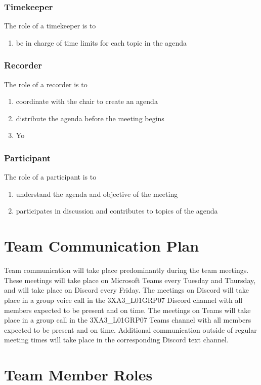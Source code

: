 \documentclass[12pt,letterpaper]{article}
\begin{document}
\subsubsection{Timekeeper}
The role of a timekeeper is to
\begin{enumerate}
    \item be in charge of time limits for each topic in the agenda
\end{enumerate}

\subsubsection{Recorder}
The role of a recorder is to 
\begin{enumerate}
    \item coordinate with the chair to create an agenda
    \item distribute the agenda before the meeting begins
    \item Yo
\end{enumerate}

\subsubsection{Participant}
The role of a participant is to 
\begin{enumerate}
    \item understand the agenda and objective of the meeting
    \item participates in discussion and contributes to topics of the agenda
\end{enumerate}

\section{Team Communication Plan}

Team communication will take place predominantly during the team meetings. These meetings will take place on Microsoft Teams every Tuesday and Thursday, and will take place on Discord every Friday. The meetings on Discord will take place in a group voice call in the 3XA3\_L01GRP07 Discord channel with all members expected to be present and on time. The meetings on Teams will take place in a group call in the 3XA3\_L01GRP07 Teams channel with all members expected to be present and on time. Additional communication outside of regular meeting times will take place in the corresponding Discord text channel.

\section{Team Member Roles}
\end{document}
